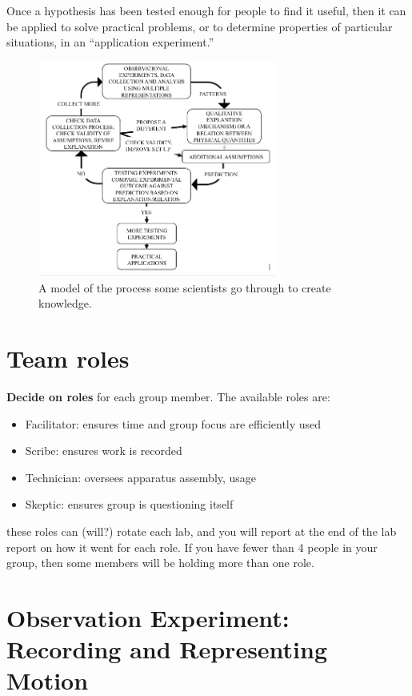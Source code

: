 Once a hypothesis has been tested enough for people to find it useful, then it can be applied to solve practical problems, or to determine properties of particular situations, in an ``application experiment.''

\begin{figure}
	\centering
	\includegraphics[width=0.7\textwidth]{force-motion-1/islegraphic.png}
	\caption{A model of the process some scientists go through to create knowledge.\cite{etkina_millikan_2015}}\label{me:fig:isle}
\end{figure}

\section{Team roles}

\textbf{Decide on roles} for each group member. The available roles are:

\begin{itemize}
	\item Facilitator: ensures time and group focus are efficiently used
	\item Scribe: ensures work is recorded
	\item Technician: oversees apparatus assembly, usage
	\item Skeptic: ensures group is questioning itself
\end{itemize}

these roles can (will?) rotate each lab, and you will report at the end of the lab report on how it went for each role. If you have fewer than 4 people in your group, then some members will be holding more than one role.

\section{Observation Experiment: Recording and Representing Motion}\label{fm1:sec:obs}

